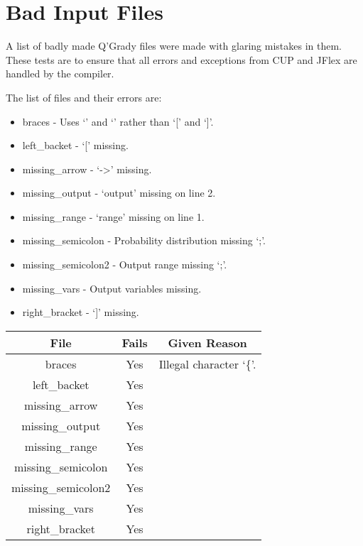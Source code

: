 \documentclass[report.tex]{subfiles}
\begin{document}

\section{Bad Input Files} %
\label{sec:bad_input_files}
A list of badly made Q'Grady files were made with glaring mistakes in them.
These tests are to ensure that all errors and exceptions from CUP and JFlex are
handled by the compiler.

The list of files and their errors are:
\begin{itemize}
    \item braces - Uses `{' and `}' rather than `[' and `]'.
    \item left_backet - `[' missing.
    \item missing_arrow - `->' missing.
    \item missing_output - `output' missing on line 2.
    \item missing_range - `range' missing on line 1.
    \item missing_semicolon - Probability distribution missing `;'.
    \item missing_semicolon2 - Output range missing `;'.
    \item missing_vars - Output variables missing.
    \item right_bracket - `]' missing.
\end{itemize}

\begin{table}[H]
    \centering
    \begin{tabular}{c | c | c}
    File & Fails & Given Reason \\
    \hline
    braces & Yes & Illegal character `\{'. \\
    left_backet & Yes & \\
    missing_arrow & Yes & \\
    missing_output & Yes & \\
    missing_range & Yes & \\
    missing_semicolon & Yes & \\
    missing_semicolon2 & Yes & \\
    missing_vars & Yes & \\
    right_bracket & Yes & \\
    \hline
    \end{tabular}
\end{table}
\end{document}
